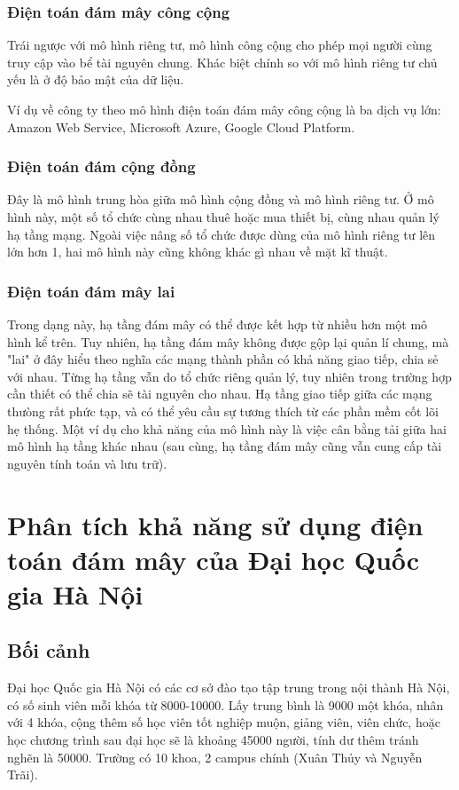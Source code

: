 \documentclass{article}
\begin{document}
\subsubsection{Điện toán đám mây công cộng}

Trái ngược với mô hình riêng tư, mô hình công cộng cho phép mọi người cùng truy
cập vào bể tài nguyên chung. Khác biệt chính so với mô hình riêng tư chủ yếu là
ở độ bảo mật của dữ liệu.

Ví dụ về công ty theo mô hình điện toán đám mây công cộng là ba dịch vụ lớn:
Amazon Web Service, Microsoft Azure, Google Cloud Platform.

\subsubsection{Điện toán đám cộng đồng}

Đây là mô hình trung hòa giữa mô hình cộng đồng và mô hình riêng tư. Ở mô hình
này, một số tổ chức cùng nhau thuê hoặc mua thiết bị, cùng nhau quản lý hạ tầng
mạng. Ngoài việc nâng số tổ chức được dùng của mô hình riêng tư lên lớn hơn 1,
hai mô hình này cũng không khác gì nhau về mặt kĩ thuật.

\subsubsection{Điện toán đám mây lai}

Trong dạng này, hạ tầng đám mây có thể được kết hợp từ nhiều hơn một mô hình kể
trên. Tuy nhiên, hạ tầng đám mây không được gộp lại quản lí chung, mà "lai" ở
đây hiểu theo nghĩa các mạng thành phần có khả năng giao tiếp, chia sẻ với nhau.
Từng hạ tầng vẫn do tổ chức riêng quản lý, tuy nhiên trong trường hợp cần thiết
có thể chia sẽ tài nguyên cho nhau. Hạ tầng giao tiếp giữa các mạng thưòng rất
phức tạp, và có thể yêu cầu sự tương thích từ các phần mềm cốt lõi hẹ thống. Một
ví dụ cho khả năng của mô hình này là việc cân bằng tải giữa hai mô hình hạ tầng
khác nhau (sau cùng, hạ tầng đám mây cũng vẫn cung cấp tài nguyên tính toán và
lưu trữ).

\section{Phân tích khả năng sử dụng điện toán đám mây của Đại học Quốc gia Hà Nội}

\subsection{Bối cảnh}
Đại học Quốc gia Hà Nội có các cơ sở đào tạo tập trung trong nội thành Hà Nội,
có số sinh viên mỗi khóa từ 8000-10000. Lấy trung bình là 9000 một khóa, nhân
với 4 khóa, cộng thêm số học viên tốt nghiệp muộn, giảng viên, viên chức, hoặc
học chương trình sau đại học sẽ là khoảng 45000 người, tính dư thêm tránh nghẽn
là 50000. Trường có 10 khoa, 2 campus chính (Xuân Thủy và Nguyễn Trãi).
\end{document}
